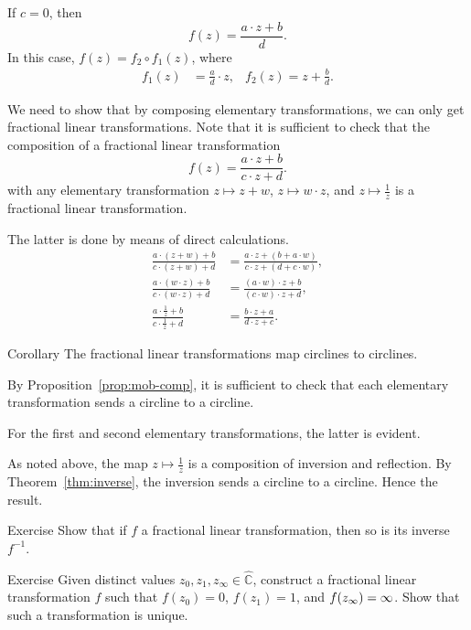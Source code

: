 If $c=0$, then
\[f(z) = \frac{a\cdot z + b}{ d}.\]
In this case, $f(z)=f_2\circ f_1 (z)$,
where 
\begin{align*}
f_1(z)&= \tfrac ad\cdot z,
&
f_2(z)= z+\tfrac bd.
\end{align*}

We need to show that by composing elementary transformations,
we can only get fractional linear transformations.
Note that it is sufficient to check that the composition of a fractional linear transformation
$$f(z) = \frac{a\cdot z + b}{c\cdot z + d}.$$
with any elementary transformation $z\mapsto z+w$, $z\mapsto w\cdot z$, and $z\mapsto \tfrac1z$ is a fractional linear transformation.

The latter is done by means of direct calculations.
\begin{align*}
\frac{a\cdot (z+w) + b}{c\cdot (z+w) + d}
&=
\frac{a\cdot z + (b+a\cdot w)}{c\cdot z + (d+c\cdot w)},
\\
\frac{a\cdot (w\cdot z) + b}{c\cdot (w\cdot z) + d}
&=
\frac{(a\cdot w)\cdot z + b}{(c\cdot w)\cdot z + d},
\\
\frac{a\cdot \frac1z + b}{c\cdot \frac1z + d}
&=
\frac{b\cdot z + a}{d\cdot z + c}.
\end{align*}
\qedsf


\begin{thm}{Corollary}\label{cor:cline-Moeb}
The fractional linear transformations map circlines to circlines.
\end{thm}

By Proposition~\ref{prop:mob-comp},
it is sufficient to check that each elementary transformation sends a circline to a circline.

For the first and second elementary transformations, the latter is evident.

As noted above,
the map $z\mapsto\tfrac1z$ is a composition of inversion and reflection.
By Theorem~\ref{thm:inverse}, the inversion sends a circline to a circline.
Hence the result.
\qeds

\begin{thm}{Exercise}\label{ex:inverse-Mob}
Show that if $f$ a fractional linear transformation, then so is its inverse $f^{-1}$.
\end{thm}


\begin{thm}{Exercise}\label{ex:3-point-Mob}
Given distinct values $z_0,z_1,z_\infty\in \hat{\mathbb{C}}$,
construct a fractional linear transformation $f$ such that 
$f(z_0)=0$,
$f(z_1)=1$,
and 
$f(z_\infty)\z=\infty$.
Show that such a transformation is unique.
\end{thm}

